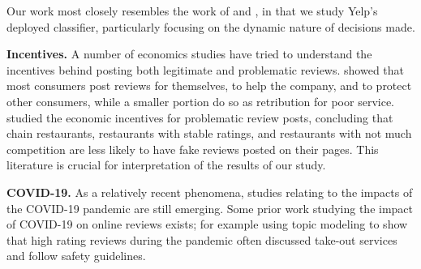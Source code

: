 Our work most closely resembles the work of \citet{kamerer2014understanding} and \citet{mukherjee2013yelp}, in that we study Yelp's deployed classifier, particularly focusing on the dynamic nature of decisions made.

\textbf{Incentives.} A number of economics studies have tried to understand the incentives behind posting both legitimate and problematic reviews. \citet{yoo2008motivates} showed that most consumers post reviews for themselves, to help the company, and to protect other consumers, while a smaller portion do so as retribution for poor service. \citet{luca2016fake} studied the economic incentives for problematic review posts, concluding that chain restaurants, restaurants with stable ratings, and restaurants with not much competition are less likely to have fake reviews posted on their pages. This literature is crucial for interpretation of the results of our study.

\textbf{COVID-19.} As a relatively recent phenomena, studies relating to the impacts of the COVID-19 pandemic are still emerging. Some prior work studying the impact of COVID-19 on online reviews exists; for example \citet{kostromitina2021his} using topic modeling to show that high rating reviews during the pandemic often discussed take-out services and follow safety guidelines.